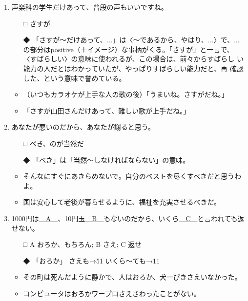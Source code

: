 \documentclass[
uplatex,
b5paper,
10pt,
dvipdfmx
]{jsbook}
\begin{document}
\begin{enumerate}
\item \underline{\hspace{3zw}}声楽科の学生だけあって、普段の声もいいですね。

\begin{itemize}
\item[□]  さすが
\item[◆] 「さすが〜だけあって、...」は〈〜であるから、やはり、...〉で、...
	  の部分はpositive（＋イメージ）な事柄がくる。「さすが」と一言で、
	  〈すばらしい〉の意味に使われるが、この場合は、前々からすばらし
	  い能力の人だとはわかっていたが、やっぱりすばらしい能力だと、再
	  確認した、という意味で誉めている。
\end{itemize}
\begin{itemize}
\item （いつもカラオケが上手な人の歌の後）「うまいね。さすがだね。」
\item 「さすが山田さんだけあって、難しい歌が上手だね。」
\end{itemize}

\item あなたが悪いのだから、あなたが謝る\underline{\hspace{3zw}}と思う。

\begin{itemize}
\item[□]  べき、のが当然だ
\item[◆] 「べき」は「当然〜しなければならない」の意味。
\end{itemize}
\begin{itemize}
\item そんなにすぐにあきらめないで。自分のベストを尽くすべきだと思うわよ。
\item 国は安心して老後が暮らせるように、福祉を充実させるべきだ。
\end{itemize}

\item 1000円は\underline{　A　}、10円玉\underline{　B　}もないのだから、いくら\underline{　C　}と言われても返せない。

\begin{itemize}
\item[□]  A おろか、もちろん; B さえ; C 返せ
\item[◆] 「おろか」 さえも→51 いくら〜ても→11
\end{itemize}
\begin{itemize}
\item その町は死んだように静かで、人はおろか、犬一ぴきさえいなかった。
\item コンピュータはおろかワープロさえさわったことがない。
\end{itemize}
\end{enumerate}
\end{document}

